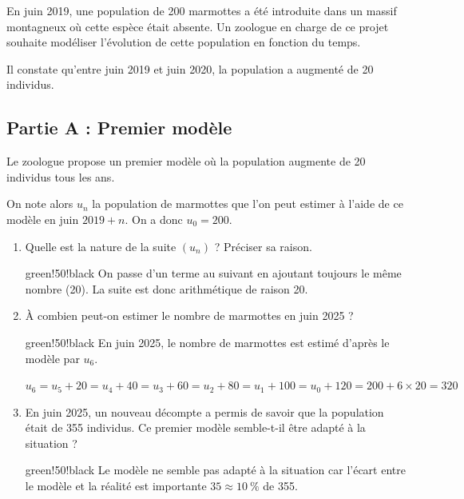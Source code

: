 En juin 2019, une population de 200 marmottes a été introduite dans un massif montagneux où cette espèce était absente. Un zoologue en charge de ce projet souhaite modéliser l'évolution de cette population en fonction du temps.
	
	Il constate qu'entre juin 2019 et juin 2020, la population a augmenté de 20 individus.
	
	\subsection*{Partie A : Premier modèle}
	
	Le zoologue propose un premier modèle où la population augmente de 20 individus tous les ans.
	
	On note alors $u_{n}$ la population de marmottes que l'on peut estimer à l'aide de ce modèle en juin $2019+n$. On a donc $u_{0}=200$.
	
	\begin{enumerate}
		\item Quelle est la nature de la suite $\left(u_{n}\right)$ ? Préciser sa raison.
		
		\begin{color}{green!50!black}
		On passe d'un terme au suivant en ajoutant toujours le même nombre (20). La suite est donc arithmétique de raison 20.
		\end{color}
		
		\item À combien peut-on estimer le nombre de marmottes en juin 2025 ?
		
		\begin{color}{green!50!black}
		En juin 2025, le nombre de marmottes est estimé d'après le modèle par $u_6$.
		
		$u_6 = u_5 + 20 = u_4 + 40 = u_3 + 60 =  u_2 + 80 = u_1 + 100 =  u_0 + 120 = 200 + 6\times 20 = 320$
		\end{color}
		
		\item En juin 2025, un nouveau décompte a permis de savoir que la population était de 355 individus. Ce premier modèle semble-t-il être adapté à la situation ?

		\begin{color}{green!50!black}
		Le modèle ne semble pas adapté à la situation car l'écart entre le modèle et la réalité est importante $35\approx 10~\%$ de 355.
		\end{color}
	\end{enumerate}
	
